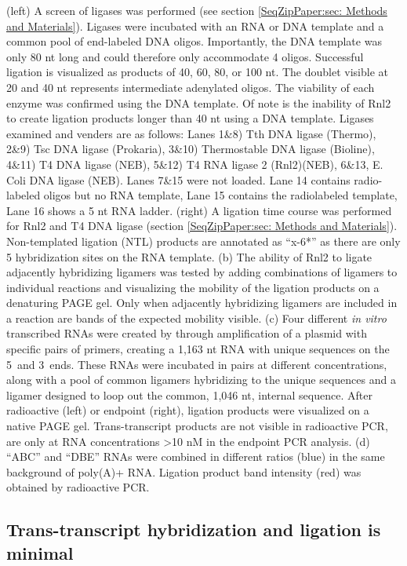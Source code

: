 			(left) A screen of ligases was performed (see section \ref{SeqZipPaper:sec: Methods and Materials}). Ligases were incubated with an RNA or DNA template and a common pool of end-labeled DNA oligos. Importantly, the DNA template was only 80 nt long and could therefore only accommodate 4 oligos. Successful ligation is visualized as products of 40, 60, 80, or 100 nt. The doublet visible at 20 and 40 nt represents intermediate adenylated oligos. The viability of each enzyme was confirmed using the DNA template. Of note is the inability of Rnl2 to create ligation products longer than 40 nt using a DNA template. Ligases examined and venders are as follows: Lanes 1\&8) Tth DNA ligase (Thermo), 2\&9) Tsc DNA ligase (Prokaria), 3\&10) Thermostable DNA ligase (Bioline), 4\&11) T4 DNA ligase (NEB), 5\&12) T4 RNA ligase 2 (Rnl2)(NEB), 6\&13, E. Coli DNA ligase (NEB). Lanes 7\&15 were not loaded. Lane 14 contains radio-labeled oligos but no RNA template, Lane 15 contains the radiolabeled template, Lane 16 shows a 5 nt RNA ladder.
			(right) A ligation time course was performed for Rnl2 and T4 DNA ligase (section \ref{SeqZipPaper:sec: Methods and Materials}). Non-templated ligation (NTL) products are annotated as ``x-6*'' as there are only 5 hybridization sites on the RNA template.
			(b) The ability of Rnl2 to ligate adjacently hybridizing ligamers was tested by adding combinations of ligamers to individual reactions and visualizing the mobility of the ligation products on a denaturing PAGE gel. Only when adjacently hybridizing ligamers are included in a reaction are bands of the expected mobility visible. 
			(c) Four different \textit{in vitro} transcribed RNAs were created by through amplification of a plasmid with specific pairs of primers, creating a 1,163 nt RNA with unique sequences on the 5\textprime~and 3\textprime~ends. These RNAs were incubated in pairs at different concentrations, along with a pool of common ligamers hybridizing to the unique sequences and a ligamer designed to loop out the common, 1,046 nt, internal sequence. After radioactive (left) or endpoint (right), ligation products were visualized on a native PAGE gel. Trans-transcript products are not visible in radioactive PCR, are only at RNA concentrations >10 nM in the endpoint PCR analysis.
			(d) ``ABC'' and ``DBE'' RNAs were combined in different ratios (blue) in the same background of poly(A)+ RNA. Ligation product band intensity (red) was obtained by radioactive PCR.

	\subsection{Trans-transcript hybridization and ligation is minimal}
		\label{SeqZipPaper:subsec: Trans-transcript hyb and ligation}

